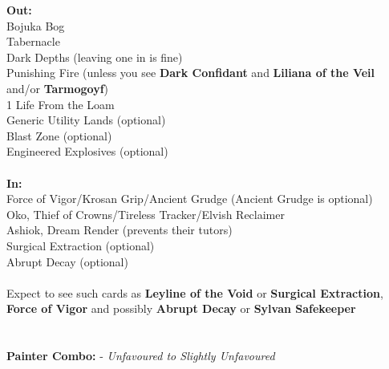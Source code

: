 \documentclass{report}
\begin{document}
\textbf{Out:}\\
Bojuka Bog\\Tabernacle\\Dark Depths (leaving one in is fine)\\Punishing Fire (unless you see \textbf{Dark Confidant} and \textbf{Liliana of the Veil} and/or \textbf{Tarmogoyf})\\1 Life From the Loam\\Generic Utility Lands (optional)\\Blast Zone (optional)\\Engineered Explosives (optional)\\\\
\textbf{In:}\\
Force of Vigor/Krosan Grip/Ancient Grudge (Ancient Grudge is optional)\\Oko, Thief of Crowns/Tireless Tracker/Elvish Reclaimer\\Ashiok, Dream Render (prevents their tutors)\\Surgical Extraction (optional)\\Abrupt Decay (optional)\\\\
Expect to see such cards as \textbf{Leyline of the Void} or \textbf{Surgical Extraction}, \textbf{Force of Vigor} and possibly \textbf{Abrupt Decay} or \textbf{Sylvan Safekeeper}\\\\\\
\textbf{Painter Combo:} - \emph{Unfavoured to Slightly Unfavoured}\\
\end{document}
